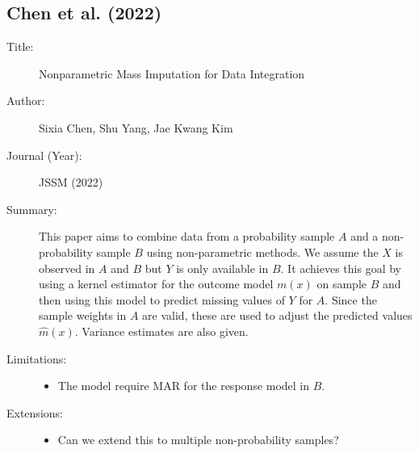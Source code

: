 \documentclass[12pt]{article}
\begin{document}
\subsection*{Chen et al. (2022)}
\begin{description}
  \item[Title:] Nonparametric Mass Imputation for Data Integration
  \item[Author:] Sixia Chen, Shu Yang, Jae Kwang Kim
  \item[Journal (Year):] JSSM (2022)
  \item[Summary:] This paper aims to combine data from a probability sample
    $A$ and a non-probability sample $B$ using non-parametric methods. We 
    assume the $X$ is observed in $A$ and $B$ but $Y$ is only available in $B$. 
    It achieves this goal by using a kernel estimator for the outcome model
    $m(x)$ on sample $B$ and then using this model to predict missing values of
    $Y$ for $A$. Since the sample weights in $A$ are valid, these are used to 
    adjust the predicted values $\hat m(x)$. Variance estimates are also given.
  \item[Limitations:]\;
    \begin{itemize}
      \item The model require MAR for the response model in $B$.
    \end{itemize}
  \item[Extensions:]\;
    \begin{itemize}
      \item Can we extend this to multiple non-probability samples?
    \end{itemize}
\end{description}
\end{document}
